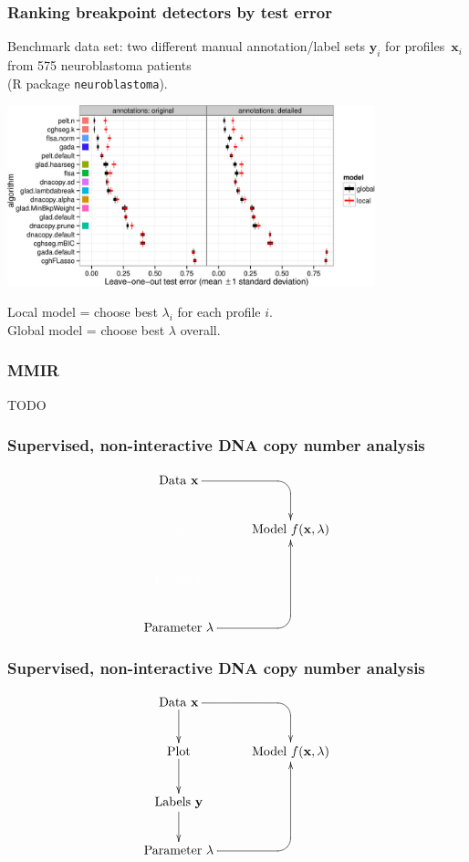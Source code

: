 \documentclass{beamer}
\begin{document}
\begin{frame}
  \frametitle{Ranking breakpoint detectors by test error}

  Benchmark data set: two different manual annotation/label sets
  $\mathbf y_i$ for profiles~$\mathbf x_i$ from 575 neuroblastoma
  patients\\
  (R package \texttt{neuroblastoma}).

  \begin{center}
      \includegraphics[width=0.8\textwidth]{bams-test-error}
  \end{center}

  Local model = choose best $\lambda_i$ for each profile $i$.\\
  Global model = choose best $\lambda$ overall.

\end{frame}

\begin{frame}
  \frametitle{MMIR}
  TODO
\end{frame}

\begin{frame}
  \frametitle{Supervised, non-interactive DNA copy number analysis}
  \begin{displaymath}
  \xymatrix{
    \text{Data $\mathbf x$}
    \ar `[r] [dr] 
    & \text{ }
    \\
    \color{white}{\text{Plot} }
    & 
    \text{Model $f(\mathbf x, \lambda)$} 
    \\
    \color{white}{\text{Labels $\mathbf y$}       }
    \\
    \text{Parameter $\lambda$} 
    \ar `r[ruu] [ruu]
    & \text{ }
  }
  \end{displaymath}
\end{frame}

\begin{frame}
  \frametitle{Supervised, non-interactive DNA copy number analysis}
  \begin{displaymath}
  \xymatrix{
    \text{Data $\mathbf x$}
    \ar `[r] [dr] 
    \ar [d]
    & \text{ }
    \\
    \text{Plot} 
    \ar [d]
    & 
    \text{Model $f(\mathbf x, \lambda)$} 
    \\
    \text{Labels $\mathbf y$}       
    \ar [d]
    \\
    \text{Parameter $\lambda$} 
    \ar `r[ruu] [ruu]
    & \text{ }
  }
  \end{displaymath}
\end{frame}
\end{document}
